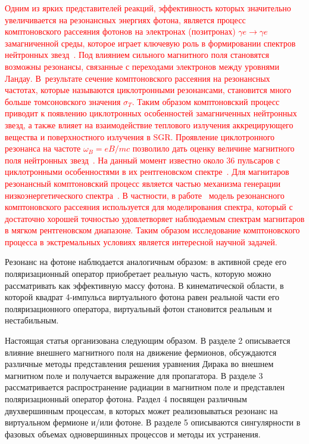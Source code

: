 \textcolor{red}{Одним из ярких представителей реакций, эффективность которых значительно увеличивается на резонансных энергиях фотона, является процесс комптоновского  рассеяния фотонов на электронах (позитронах) $\gamma e \to \gamma e$ 
замагниченной среды, которое играет ключевую роль в формировании спектров нейтронных звезд~\cite{Miller:1995,Bulik:1997,Suleimanov:2007it,Nobili:2008,Taverna:2014}.
Под влиянием сильного магнитного поля становятся возможны резонансы, связанные с переходами электронов между уровнями Ландау. В~результате сечение комптоновского рассеяния на резонансных частотах, которые называются циклотронными резонансами, становится много больше томсоновского значения $\sigma_T$. Таким образом комптоновский процесс приводит к появлению циклотронных особенностей замагниченных нейтронных звезд, а также влияет на взаимодействие теплового излучения аккрецирующего вещества и поверхностного излучения в SGR. Проявление циклотронного резонанса на частоте $\omega_B=eB/mc$ позволило дать оценку величине магнитного поля нейтронных звезд~\cite{Mitrofanov:1982}.  На данный момент известно около 36 пульсаров с циклотронными особенностями в их рентгеновском спектре~\cite{Staubert:2019}. Для магнитаров резонансный комптоновский процесс является частью механизма генерации низкоэнергетического спектра~\cite{Lyutikov:2002,Rea:2008}. В частности, в работе~\cite{Rea:2008} модель резонансного комптоновского рассеяния используется для моделирования спектра, который с достаточно хорошей точностью удовлетворяет наблюдаемым спектрам магнитаров в мягком рентгеновском диапазоне. Таким образом исследование комптоновского процесса в экстремальных условиях является интересной научной задачей.}

Резонанс на фотоне наблюдается аналогичным образом: в активной среде его поляризационный оператор приобретает реальную часть, которую можно рассматривать как эффективную массу фотона. В кинематической 
области, в которой квадрат 4-импульса виртуального фотона равен реальной части его поляризационного оператора, виртуальный фотон становится реальным и нестабильным.

Настоящая статья организована следующим образом. В разделе 2 описывается влияние внешнего магнитного поля на движение фермионов, обсуждаются различные методы представления решения уравнения Дирака во внешнем магнитном поле и получается выражение для пропагатора. В разделе 3 рассматривается распространение радиации в магнитном поле и представлен поляризационный оператор фотона. Раздел 4 посвящен различным двухвершинным процессам, в которых может 
реализовываться резонанс на виртуальном фермионе и/или фотоне. В разделе 5 описываются сингулярности в фазовых объемах одновершинных процессов и методы их устранения.